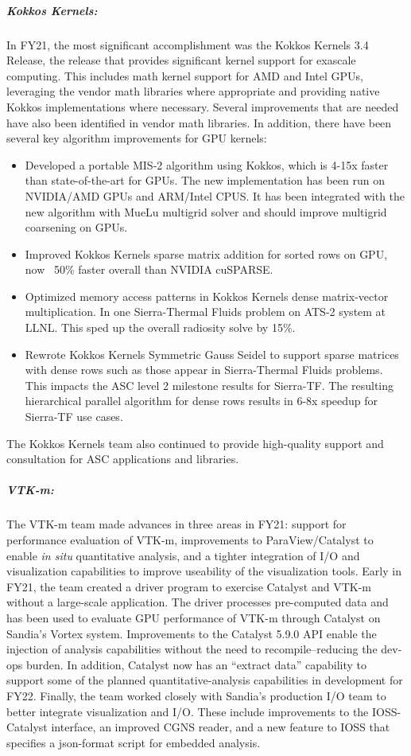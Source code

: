 \subparagraph{Kokkos Kernels:} In FY21, the most significant accomplishment was the Kokkos Kernels 3.4 Release, the release that provides significant kernel support for exascale computing.  This includes math kernel support for AMD and Intel GPUs, leveraging the vendor math libraries where appropriate and providing native Kokkos implementations where necessary.  Several improvements that are needed have also been identified in vendor math libraries.  In addition, there have been several key algorithm improvements for GPU kernels:
\begin{itemize}
\item Developed a portable MIS-2 algorithm using Kokkos, which is 4-15x faster than state-of-the-art for GPUs. The new implementation has been run on NVIDIA/AMD GPUs and ARM/Intel CPUS.  It has been integrated with the new algorithm with MueLu multigrid solver and should improve multigrid coarsening on GPUs.
\item Improved Kokkos Kernels sparse matrix addition for sorted rows on GPU, now ~50\% faster overall than NVIDIA cuSPARSE.
\item Optimized memory access patterns in Kokkos Kernels dense matrix-vector multiplication. In one Sierra-Thermal Fluids problem on ATS-2 system at LLNL.  This sped up the overall radiosity solve by 15\%.
\item Rewrote Kokkos Kernels Symmetric Gauss Seidel to support sparse matrices with dense rows such as those appear in Sierra-Thermal Fluids problems. This impacts the ASC level 2 milestone results for Sierra-TF. The resulting hierarchical parallel algorithm for dense rows results in 6-8x speedup for Sierra-TF use cases. 
\end{itemize}

The Kokkos Kernels team also continued to provide high-quality support and consultation for ASC applications and libraries.
 

\subparagraph{VTK-m:} The VTK-m team made advances in three areas in FY21: support for performance evaluation of VTK-m, improvements to ParaView/Catalyst to enable \emph{in situ} quantitative analysis, and a tighter integration of I/O and visualization capabilities to improve useability of the visualization tools.  Early in FY21, the team created a driver program to exercise Catalyst and VTK-m without a large-scale application.  The driver processes pre-computed data and has been used to evaluate GPU performance of VTK-m through Catalyst on Sandia's Vortex system. Improvements to the Catalyst 5.9.0 API enable the injection of analysis capabilities without the need to recompile--reducing the dev-ops burden.  In addition, Catalyst now has an ``extract data'' capability to support some of the planned quantitative-analysis capabilities in development for FY22.  Finally, the team worked closely with Sandia's production I/O team to better integrate visualization and I/O.  These include improvements to the IOSS-Catalyst interface, an improved CGNS reader, and a new feature to IOSS that specifies a json-format script for embedded analysis. 


